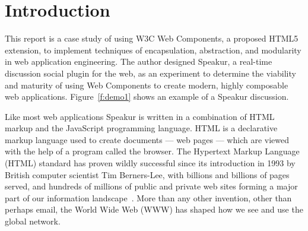 \chapter{Introduction}
%
\label{ch:intro}

%
%

This report is a case study of using W3C Web Components, 
a proposed HTML5 extension,
to implement techniques of encapsulation, abstraction, 
and modularity in web application engineering.
The author designed Speakur, a real-time discussion social plugin for the web, 
as an experiment to determine the viability and maturity of using Web Components to create modern, highly composable web applications. 
Figure~\ref{f:demo1} shows an example of a Speakur discussion.

Like most web applications Speakur is written in a combination of HTML markup and the Java\-Script programming language. 
HTML is a declarative markup language used to create documents --- web pages --- which are viewed with the help of a program called the browser. 
The Hyper\-text Markup Language (HTML) 
standard has proven wildly successful since its introduction in 1993 by British computer scientist 
Tim Berners-Lee, 
with billions and billions of pages served, 
and hundreds of millions of public and private web sites forming a major part of our information landscape~\cite{internetlivestats.com2015}.
More than any other invention, other than perhaps email, the World Wide Web (WWW) has shaped how we see and use the global network.

